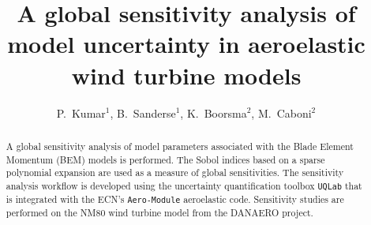 \documentclass[a4paper]{jpconf}
\newcommand{\myreferences}{../references,../Mendeley_refs}
\numberwithin{equation}{section}
\begin{document}



\title{A global sensitivity analysis of model uncertainty in aeroelastic wind turbine models}


\author{P.~Kumar$^{1}$, B.~Sanderse$^{1}$, K.~Boorsma$^{2}$, M.~Caboni$^{2}$} 
\address{$^{1}$ Centrum Wiskunde \& Informatica (CWI), Amsterdam, The Netherlands}
\address{$^{2}$ TNO, Westerduinweg 3, Petten, The Netherlands}


\begin{abstract}
A global sensitivity analysis of model parameters associated with the Blade Element Momentum (BEM) models is performed. The Sobol indices based on a sparse polynomial  expansion are used as a measure of global sensitivities. The sensitivity analysis workflow is developed using the uncertainty quantification toolbox \texttt{UQLab} that is integrated with the ECN's \texttt{Aero-Module} aeroelastic code. Sensitivity studies are performed on the NM80 wind turbine model from the DANAERO project.
\end{abstract}









%
\end{document}
